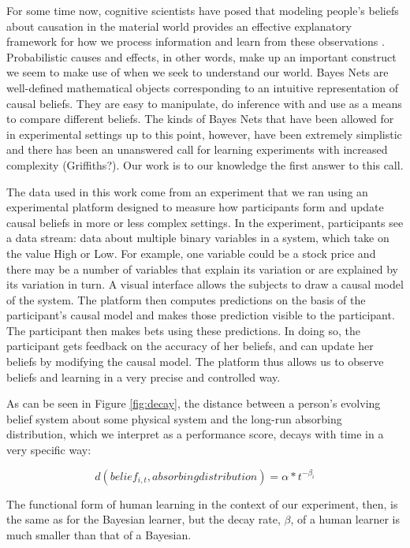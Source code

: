 For some time now, cognitive scientists have posed that modeling people's beliefs about causation in the material world provides an effective explanatory framework for how we process information and learn from these observations \cite{Griffiths2008}.  Probabilistic causes and effects, in other words, make up an important construct we seem to make use of when we seek to understand our world.  Bayes Nets are well-defined mathematical objects corresponding to an intuitive representation of causal beliefs.  They are easy to manipulate, do inference with and use as a means to compare different beliefs.  The kinds of Bayes Nets that have been allowed for in experimental settings up to this point, however, have been extremely simplistic and there has been an unanswered call for learning experiments with increased complexity (Griffiths?).  Our work is to our knowledge the first answer to this call.

The data used in this work come from an experiment that we ran using an experimental platform designed to measure how participants form and update causal beliefs in more or less complex settings.  In the experiment, participants see a data stream: data about multiple binary variables in a system, which take on the value High or Low. For example, one variable could be a stock price and there may be a number of variables that explain its variation or are explained by its variation in turn.  A visual interface allows the subjects to draw a causal model of the system. The platform then computes predictions on the basis of the participant's causal model and makes those prediction visible to the participant. The participant then makes bets using these predictions. In doing so, the participant gets feedback on the accuracy of her beliefs, and can update her beliefs by modifying the causal model. The platform thus allows us to observe beliefs and learning in a very precise and controlled way.

As can be seen in Figure \ref{fig:decay}, the distance between a person's evolving belief system about some physical system and the long-run absorbing distribution, which we interpret as a performance score, decays with time in a very specific way:

\begin{equation}
\label{ }
d(belief_{i, t}, absorbing distribution) = \alpha*t^{-\beta_i}
\end{equation}



The functional form of human learning in the context of our experiment, then, is the same as for the Bayesian learner, but the decay rate, $\beta$, of a human learner is much smaller than that of a Bayesian.
